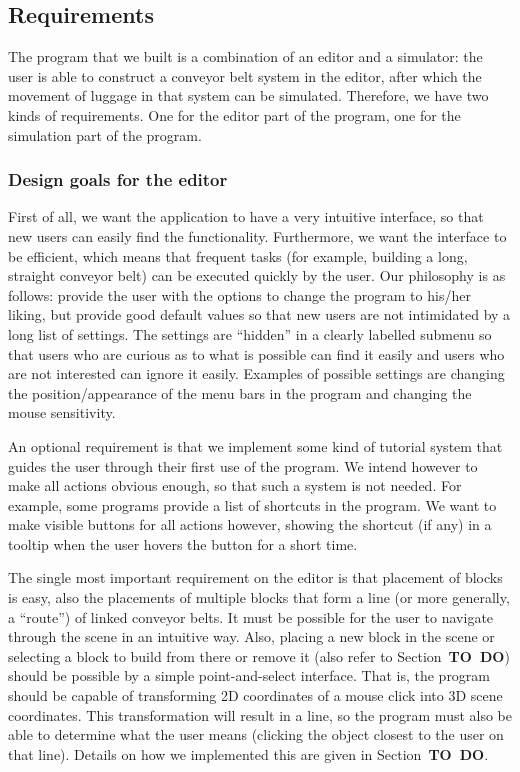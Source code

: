 \subsection{Requirements}
The program that we built is a combination of an editor and a simulator: the user is able to construct a conveyor belt system in the editor, after which the movement of luggage in that system can be simulated. Therefore, we have two kinds of requirements. One for the editor part of the program, one for the simulation part of the program.

\subsubsection{Design goals for the editor}
First of all, we want the application to have a very intuitive interface, so that new users can easily find the functionality. Furthermore, we want the interface to be efficient, which means that frequent tasks (for example, building a long, straight conveyor belt) can be executed quickly by the user. Our philosophy is as follows: provide the user with the options to change the program to his/her liking, but provide good default values so that new users are not intimidated by a long list of settings. The settings are ``hidden'' in a clearly labelled submenu so that users who are curious as to what is possible can find it easily and users who are not interested can ignore it easily. Examples of possible settings are changing the position/appearance of the menu bars in the program and changing the mouse sensitivity.

An optional requirement is that we implement some kind of tutorial system that guides the user through their first use of the program. We intend however to make all actions obvious enough, so that such a system is not needed. For example, some programs provide a list of shortcuts in the program. We want to make visible buttons for all actions however, showing the shortcut (if any) in a tooltip when the user hovers the button for a short time.

The single most important requirement on the editor is that placement of blocks is easy, also the placements of multiple blocks that form a line (or more generally, a ``route'') of linked conveyor belts. It must be possible for the user to navigate through the scene in an intuitive way. Also, placing a new block in the scene or selecting a block to build from there or remove it (also refer to Section~\textbf{TO~DO}) should be possible by a simple point-and-select interface. That is, the program should be capable of transforming 2D coordinates of a mouse click into 3D scene coordinates. This transformation will result in a line, so the program must also be able to determine what the user means (clicking the object closest to the user on that line). Details on how we implemented this are given in Section~\textbf{TO~DO}.

